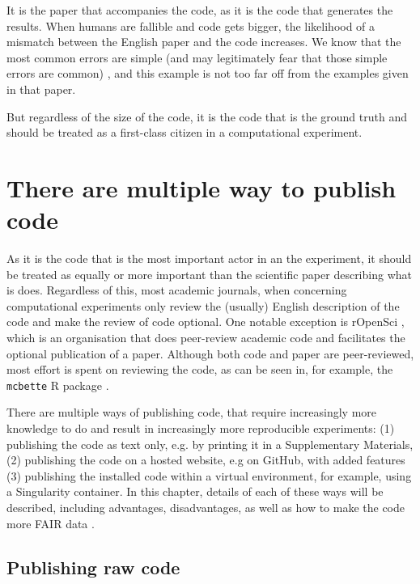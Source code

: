 It is the paper that accompanies the code,
as it is the code that generates the results.
When humans are fallible and code gets bigger, the likelihood of
a mismatch between the English paper and the code increases.
We know that the most common errors are 
simple (and may legitimately fear that those simple errors are common) 
\cite{baggerly2009deriving},
and this example is not too far off from the
examples given in that paper.

But regardless of the size of the code, 
it is the code that is the ground truth
and should be treated as a first-class citizen
in a computational experiment.

\section{There are multiple way to publish code}

As it is the code that is the most important actor in an the experiment,
it should be treated as equally or more important than the scientific
paper describing what is does.
Regardless of this, most academic journals, 
when concerning computational experiments
only review the (usually) English description of the code
and make the review of code optional.
One notable exception is rOpenSci \cite{ram2018community},
which is an organisation that does peer-review academic code 
and facilitates the optional publication of a paper.
Although both code and paper are peer-reviewed,
most effort is spent on reviewing the code,
as can be seen in, for example, 
the \verb|mcbette| R package \cite{bilderbeek2020mcbette}.

There are multiple ways of publishing code,
that require increasingly more knowledge to do and result
in increasingly more reproducible experiments:
(1) publishing the code as text only, e.g. by printing
it in a Supplementary Materials, (2) publishing
the code on a hosted website, e.g on GitHub, with
added features (3) publishing 
the installed code within a virtual environment,
for example, using a Singularity container.
In this chapter, details of each of these ways will be described,
including advantages, disadvantages, as well as how to
make the code more FAIR data \cite{wilkinson2016fair}.

\subsection{Publishing raw code}


